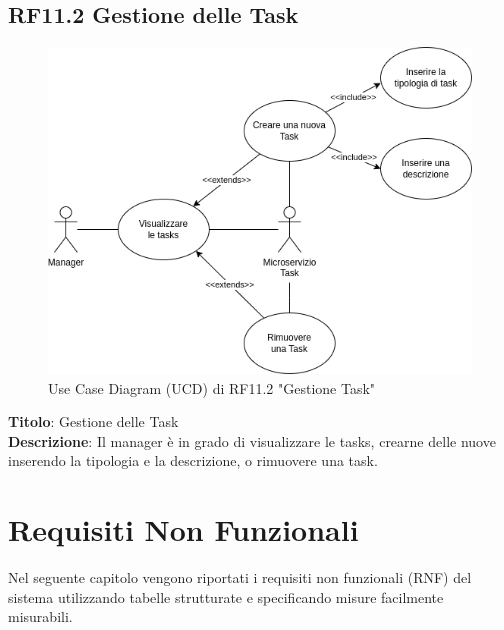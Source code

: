 \documentclass{report}
\begin{document}
\subsection*{RF11.2 Gestione delle Task}
\begin{figure}[H]
	\centering\includegraphics[width=1\textwidth]{images/UCD/RF11.2_gestione_task_UCD.png}
	Use Case Diagram (UCD) di RF11.2 "Gestione Task"
\end{figure}

\textbf{Titolo}: Gestione delle Task\\
\textbf{Descrizione}: Il manager è in grado di visualizzare le tasks, crearne delle nuove inserendo la tipologia e la descrizione, o rimuovere una task.

\pagebreak

\section{Requisiti Non Funzionali}
Nel seguente capitolo vengono riportati i requisiti non funzionali (RNF) del sistema utilizzando tabelle strutturate e specificando misure facilmente misurabili.
\end{document}
